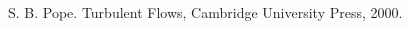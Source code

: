 \documentclass[10pt]{article}
\newcommand{\diff}[2] {\dfrac{\partial #1}{\partial #2}}
\begin{document}
% 


 \begin{thebibliography}{99}

S. B. Pope. Turbulent Flows, Cambridge University Press, 2000.

 \end{thebibliography}
\end{document}
